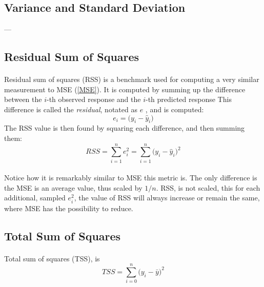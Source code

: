 \documentclass[12pt,letterpaper]{article}
\begin{document}

\subsection{Variance and Standard Deviation}
---



\subsection{Residual Sum of Squares}
\paragraph*{}Residual sum of squares (RSS) is a benchmark used for computing a very similar measurement to MSE (\ref{MSE}). It is computed by summing up the difference between the $i$-th observed response and the $i$-th predicted response This difference is called the \textit{residual}, notated as $e$ \cite{James}, and is computed:
\begin{equation}
\label{residual}
e_i = \big(y_i - \hat{y}_i \big)
\end{equation}
The RSS value is then found by squaring each difference, and then summing them:
\begin{equation}
\label{RSS}
RSS = \sum_{i=1}^{n} e_i^2 = \sum_{i=1}^n \big(y_i - \hat{y}_i \big)^2
\end{equation}
\paragraph*{}Notice how it is remarkably similar to MSE this metric is. The only difference is the MSE is an average value, thus scaled by $1/n$. RSS, is not scaled, this for each additional, sampled $e_i^2$, the value of RSS will always increase or remain the same, where MSE has the possibility to reduce.


\subsection{Total Sum of Squares}
\paragraph*{}Total sum of squares (TSS), is
\begin{equation}
\label{TSS}
TSS = \sum_{i=0}^n \big(y_i - \bar{y}\big)^2
\end{equation}
\end{document}
